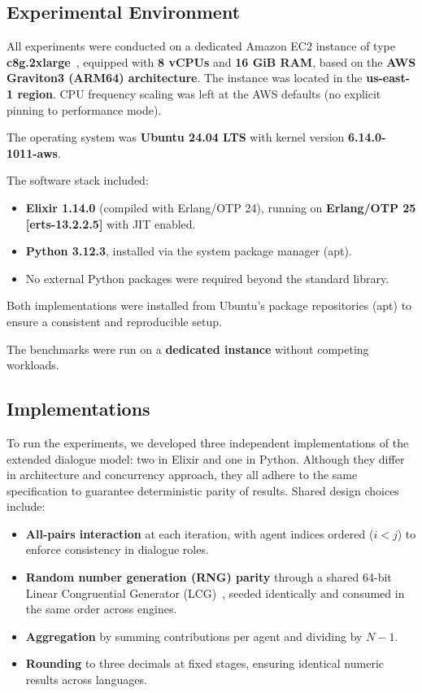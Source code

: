 \documentclass[
]{ceurart}
\begin{document}
\subsection{Experimental Environment}
All experiments were conducted on a dedicated Amazon EC2 instance of type \textbf{c8g.2xlarge}~\cite{AwsInstanceTypes2025}, equipped with \textbf{8 vCPUs} and \textbf{16 GiB RAM}, based on the \textbf{AWS Graviton3 (ARM64) architecture}. The instance was located in the \textbf{us-east-1 region}. CPU frequency scaling was left at the AWS defaults (no explicit pinning to performance mode).

The operating system was \textbf{Ubuntu 24.04 LTS} with kernel version \textbf{6.14.0-1011-aws}.%

The software stack included:
\begin{itemize}
    \item \textbf{Elixir 1.14.0} (compiled with Erlang/OTP 24), running on \textbf{Erlang/OTP 25 [erts-13.2.2.5]} with JIT enabled.
    \item \textbf{Python 3.12.3}, installed via the system package manager (apt).
    \item No external Python packages were required beyond the standard library.
\end{itemize}

Both implementations were installed from Ubuntu's package repositories (apt) to ensure a consistent and reproducible setup.


The benchmarks were run on a \textbf{dedicated instance} without competing workloads.

\subsection{Implementations}
To run the experiments, we developed three independent implementations of the extended dialogue model: two in Elixir and one in Python. Although they differ in architecture and concurrency approach, they all adhere to the same specification to guarantee deterministic parity of results. Shared design choices include:

\begin{itemize}
	\item \textbf{All-pairs interaction} at each iteration, with agent indices ordered ($i < j$) to enforce consistency in dialogue roles.
	\item \textbf{Random number generation (RNG) parity} through a shared 64-bit Linear Congruential Generator (LCG)~\cite{Thomson1958}, seeded identically and consumed in the same order across engines.
	\item \textbf{Aggregation} by summing contributions per agent and dividing by $N-1$.
	\item \textbf{Rounding} to three decimals at fixed stages, ensuring identical numeric results across languages.
\end{itemize}
\end{document}
